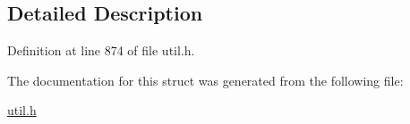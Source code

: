 \subsection{Detailed Description}


Definition at line 874 of file util.\-h.



The documentation for this struct was generated from the following file\-:\begin{DoxyCompactItemize}
\item 
\hyperlink{util_8h}{util.\-h}\end{DoxyCompactItemize}
